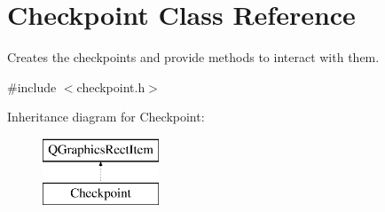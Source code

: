 \hypertarget{class_checkpoint}{}\section{Checkpoint Class Reference}
\label{class_checkpoint}


Creates the checkpoints and provide methods to interact with them.  




{\ttfamily \#include $<$checkpoint.\+h$>$}

Inheritance diagram for Checkpoint\+:\begin{figure}[H]
\begin{center}
\leavevmode
\includegraphics[height=2.000000cm]{class_checkpoint}
\end{center}
\end{figure}
